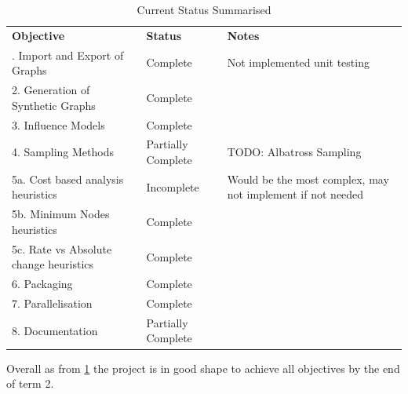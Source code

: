 \documentclass{article}
\begin{document}
\begin{table}[h]
	\centering
	\begin{tabular}{|p{5.8cm}|p{2.9cm}|p{5cm}|}
		\hline
		\textbf{Objective}                     & \textbf{Status}    & \textbf{Notes}                                             \\
		\rowcolor{green}
		\hline
		1. Import and Export of Graphs         & Complete           & Not implemented unit testing                               \\
		\hline
		\rowcolor{green}
		2. Generation of Synthetic Graphs      & Complete           &                                                            \\
		\hline
		\rowcolor{green}
		3. Influence Models                    & Complete           &                                                            \\
		\hline
		\rowcolor{yellow}
		4. Sampling Methods                    & Partially Complete & TODO: Albatross Sampling                                   \\
		\hline
		\rowcolor{red}
		5a. Cost based analysis heuristics     & Incomplete         & Would be the most complex, may not implement if not needed \\
		\hline
		\rowcolor{green}
		5b. Minimum Nodes heuristics           & Complete           &                                                            \\
		\hline
		\rowcolor{green}
		5c. Rate vs Absolute change heuristics & Complete           &                                                            \\
		\hline
		\rowcolor{green}
		6. Packaging                           & Complete           &                                                            \\
		\hline
		\rowcolor{green}
		7. Parallelisation                     & Complete           &                                                            \\
		\hline
		\rowcolor{yellow}
		8. Documentation                       & Partially Complete &                                                            \\
		\hline
	\end{tabular}
	\caption{Current Status Summarised}
	\label{statusOverview}
\end{table}

Overall as from \ref{statusOverview} the project is in good shape to achieve all objectives by the end of term 2.
\end{document}
